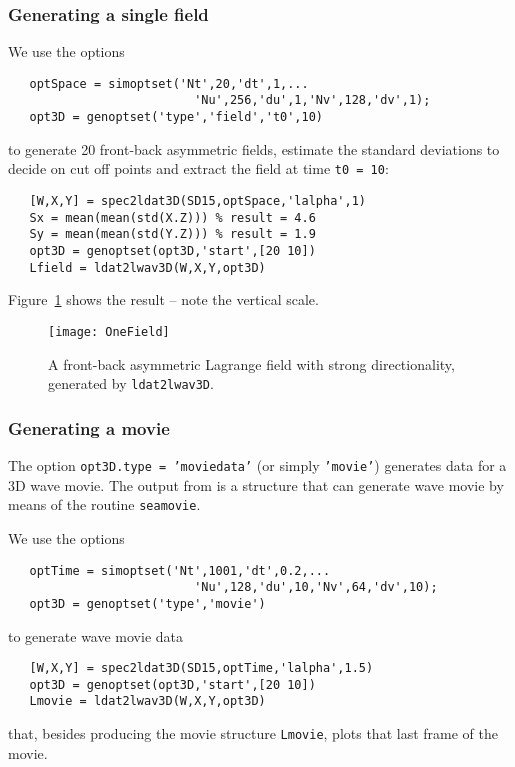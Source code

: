 \subsubsection*{Generating a single field}
We use the options
{\small\begin{verbatim}
   optSpace = simoptset('Nt',20,'dt',1,...
                          'Nu',256,'du',1,'Nv',128,'dv',1);
   opt3D = genoptset('type','field','t0',10)
\end{verbatim}
}
\noindent to generate 20 front-back asymmetric fields, estimate the standard deviations to decide on cut off points and extract the field at time  {\tt t0 = 10}:
{\small\begin{verbatim}
   [W,X,Y] = spec2ldat3D(SD15,optSpace,'lalpha',1)
   Sx = mean(mean(std(X.Z))) % result = 4.6
   Sy = mean(mean(std(Y.Z))) % result = 1.9
   opt3D = genoptset(opt3D,'start',[20 10])
   Lfield = ldat2lwav3D(W,X,Y,opt3D)
\end{verbatim}
}
\noindent Figure~\ref{OneField} shows the result -- note the vertical scale.
\begin{figure}
\centerline{
\texttt{[image: OneField]}
}
\caption{A front-back asymmetric Lagrange field with strong directionality, generated by {\tt ldat2lwav3D}.}
\label{OneField}
\end{figure}
\subsubsection*{Generating a movie}
The option {\tt opt3D.type = 'moviedata'} (or simply {\tt 'movie'}) generates data for a 3D wave movie.
The output from is a structure that can generate wave movie by means of the routine {\tt seamovie}.

We use the options
{\small\begin{verbatim}
   optTime = simoptset('Nt',1001,'dt',0.2,...
                          'Nu',128,'du',10,'Nv',64,'dv',10);
   opt3D = genoptset('type','movie')
\end{verbatim}
}
\noindent
to generate wave movie data
{\small\begin{verbatim}
   [W,X,Y] = spec2ldat3D(SD15,optTime,'lalpha',1.5)
   opt3D = genoptset(opt3D,'start',[20 10])
   Lmovie = ldat2lwav3D(W,X,Y,opt3D)
\end{verbatim}
}
\noindent that, besides producing the movie structure {\tt Lmovie}, plots that last frame of the movie.

